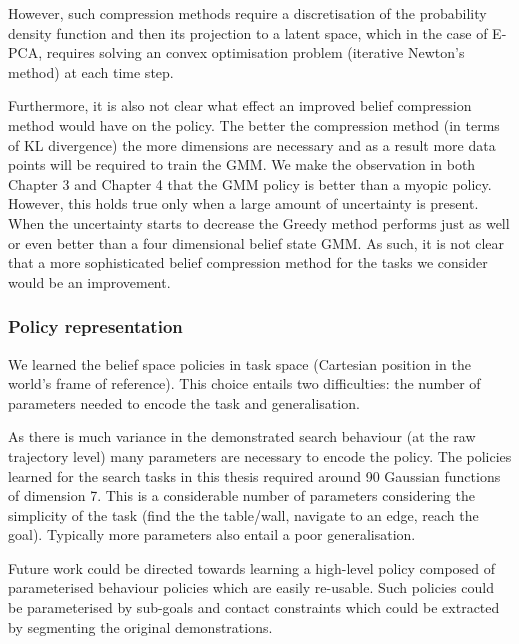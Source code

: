However, such compression methods require a discretisation of the probability 
density function and then its projection to a latent space, which in the case of E-PCA, requires solving
an convex optimisation problem (iterative Newton's method) at each time step. 

Furthermore, it is also not clear what effect an improved belief compression method would have on the policy. The better 
the compression method (in terms of KL divergence) the more dimensions are necessary and as a result 
more data points will be required to train the GMM. We make the observation in both Chapter 3 and Chapter 4 that the 
GMM policy is better than a myopic policy. However, this holds true only when a large amount of uncertainty 
is present. When the uncertainty starts to decrease the Greedy method performs just as well or even better than a 
four dimensional belief state GMM. As such, it is not clear that a more sophisticated belief compression method for 
the tasks we consider would be an improvement.


\subsubsection{Policy representation}


We learned the belief space policies in task space (Cartesian position in the world's frame of reference). 
This choice entails two difficulties: the number of parameters needed to encode the task and 
generalisation.

As there is much variance in the demonstrated search behaviour (at the raw trajectory level) many parameters 
are necessary to encode the policy. The policies learned for the search tasks in this thesis required 
around 90 Gaussian functions of dimension 7. 
This is a considerable number of parameters considering the simplicity of the task (find the the table/wall, 
navigate to an edge, reach the goal). Typically more parameters also entail a poor generalisation. 

Future work could be directed towards learning a high-level policy composed of parameterised 
behaviour policies which are easily re-usable. Such policies could be parameterised by sub-goals 
and contact constraints which could be extracted by segmenting the original demonstrations.

